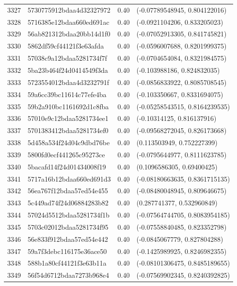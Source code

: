 \begin{table}[ht]
\begin{tabular}{rlrl}
  3327 & 5730775912bdaa4d32327972 & 0.40 & (-0.07789548945, 0.804122016) \\ 
  3328 & 5716385e12bdaa660ed691ac & 0.40 & (-0.0921104206, 0.833205023) \\ 
  3329 & 56ab821312bdaa20bb14d1f0 & 0.40 & (-0.07052913305, 0.841745821) \\ 
  3330 & 5862df59cf44121f3e63afda & 0.40 & (-0.0596007688, 0.8201999375) \\ 
  3331 & 57038c9a12bdaa5281734f7f & 0.40 & (-0.0704654084, 0.8321984575) \\ 
  3332 & 5ba23b464f24d0414549f3da & 0.40 & (-0.103988186, 0.824832035) \\ 
  3333 & 5723554012bdaa4d3232791f & 0.40 & (-0.0856833922, 0.8085708545) \\ 
  3334 & 59a6cc39bc11614c77efe4ba & 0.40 & (-0.103350667, 0.8331694075) \\ 
  3335 & 59b2a910bc1161692d1c8fba & 0.40 & (-0.05258543515, 0.8164239535) \\ 
  3336 & 57010e9c12bdaa5281734ee1 & 0.40 & (-0.10314125, 0.816137916) \\ 
  3337 & 5701383412bdaa5281734ef0 & 0.40 & (-0.09568272045, 0.826173668) \\ 
  3338 & 5d458a534f24d04c9dbd76be & 0.40 & (0.113503949, 0.752227399) \\ 
  3339 & 5800fd0ecf441265c95273ce & 0.40 & (-0.0795644977, 0.8111623785) \\ 
  3340 & 5bacafd14f24d01434008f19 & 0.40 & (0.1096586305, 0.69400425) \\ 
  3341 & 5717a16b12bdaa660ed691d3 & 0.40 & (-0.08180663635, 0.8361715135) \\ 
  3342 & 56ea767f12bdaa57ed54e455 & 0.40 & (-0.08480048945, 0.809646675) \\ 
  3343 & 5c449ad74f24d06884283b82 & 0.40 & (0.287741377, 0.532960849) \\ 
  3344 & 57024d5512bdaa5281734f1b & 0.40 & (-0.07564744705, 0.8083954185) \\ 
  3345 & 5703c02012bdaa5281734f95 & 0.40 & (-0.07558840485, 0.823352798) \\ 
  3346 & 56e833f912bdaa57ed54e442 & 0.40 & (-0.0845067779, 0.827804288) \\ 
  3347 & 59a7f3debc116175e36ace50 & 0.40 & (-0.1425989925, 0.8246982355) \\ 
  3348 & 588b1a80cf44121f3e63b11a & 0.40 & (-0.08101306475, 0.8485189655) \\ 
  3349 & 56f54d6712bdaa7273b968e4 & 0.40 & (-0.07569902345, 0.8240392825) \\ 

\end{tabular}
\end{table}
